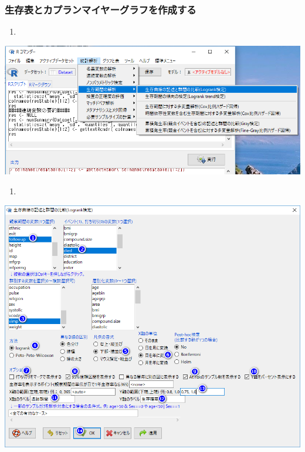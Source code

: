 \documentclass[11pt,]{problemset}
\begin{document}
\subsubsection{生存表とカプランマイヤーグラフを作成する}

\begin{enumerate}
\def\labelenumi{\arabic{enumi}.}
\item
\end{enumerate}

\begin{center}\includegraphics[width=0.7\linewidth,height=0.35\textheight]{pic/survival07} \end{center}

\begin{enumerate}
\def\labelenumi{\arabic{enumi}.}
\setcounter{enumi}{1}
\item
\end{enumerate}

\begin{center}\includegraphics[width=1\linewidth,height=0.5\textheight]{pic/survival08} \end{center}
\end{document}
